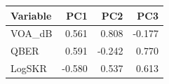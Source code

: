 \begin{tabular}{lrrr}
\toprule
Variable & PC1 & PC2 & PC3 \\
\midrule
VOA\_dB & 0.561 & 0.808 & -0.177 \\
QBER & 0.591 & -0.242 & 0.770 \\
LogSKR & -0.580 & 0.537 & 0.613 \\
\bottomrule
\end{tabular}
